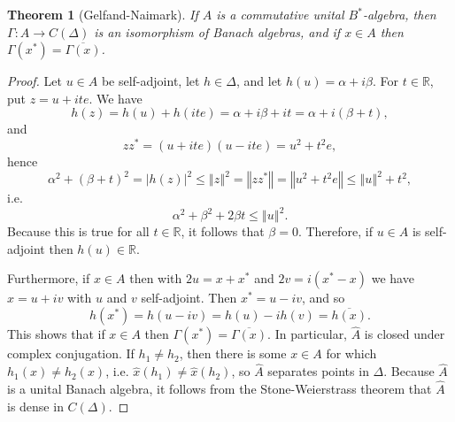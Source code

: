 \documentclass{article}
\newcommand{\norm}[1]{\left\Vert #1 \right\Vert}
\newtheorem{theorem}{Theorem}
\theoremstyle{definition}
\begin{document}
\begin{theorem}[Gelfand-Naimark]
If $A$ is a commutative unital $B^*$-algebra, then $\Gamma:A \to C(\Delta)$ is an isomorphism of Banach algebras, and if $x \in A$ then
$\Gamma(x^*)=\overline{\Gamma(x)}$.
\label{naimark}
\end{theorem}
\begin{proof}
Let $u \in A$ be self-adjoint, let $h \in \Delta$, and let $h(u)=\alpha + i\beta$. For $t \in \mathbb{R}$, put $z=u+ite$. 
We have
\[
h(z) = h(u)+h(ite) = \alpha+ i\beta + it = \alpha+i(\beta+t),
\]
and
\[
zz^*=(u+ite)(u-ite) = u^2+t^2 e,
\]
hence
\[
\alpha^2+(\beta+t)^2 = |h(z)|^2 \leq \norm{z}^2 = \norm{zz^*} =\norm{u^2+t^2e} \leq \norm{u}^2 + t^2,
\]
i.e.
\[
\alpha^2 + \beta^2 + 2 \beta t \leq \norm{u}^2.
\]
Because this is true for all $t \in \mathbb{R}$, it follows that $\beta=0$. Therefore, if $u \in A$ is self-adjoint then $h(u) \in \mathbb{R}$.

Furthermore, if $x \in A$ then with $2u=x+x^*$ and $2v=i(x^*-x)$ we have $x=u+iv$ with $u$ and $v$ self-adjoint. Then
$x^*=u-iv$, and so
\[
h(x^*)=h(u-iv)=h(u)-ih(v) = \overline{h(x)}.
\]
This shows that if $x \in A$ then $\Gamma(x^*)=\overline{\Gamma(x)}$.
In particular, $\widehat{A}$ is closed under complex conjugation. If $h_1 \neq h_2$, then there is some $x \in A$ for which
$h_1(x) \neq h_2(x)$, i.e. $\hat{x}(h_1) \neq \hat{x}(h_2)$, so $\widehat{A}$ separates points in $\Delta$. 
Because $\widehat{A}$ is a  unital Banach algebra, it follows from
the Stone-Weierstrass theorem that $\widehat{A}$ is dense in $C(\Delta)$. 


\end{proof}
\end{document}
